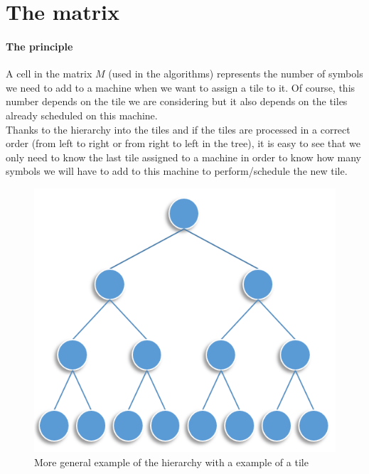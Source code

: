\documentclass[a4paper, 11pt]{report}
\begin{document}
\newpage
\section{The matrix}
\paragraph{The principle} A cell in the matrix $M$ (used in the algorithms) represents the number of symbols we need to add to a machine when we want to assign a tile to it. Of course, this number depends on the tile we are considering but it also depends on the tiles already scheduled on this machine.\\
Thanks to the hierarchy into the tiles and if the tiles are processed in a correct order (from left to right or from right to left in the tree), it is easy to see that we only need to know the last tile assigned to a machine in order to know how many symbols we will have to add to this machine to perform/schedule the new tile.\\

\begin{figure}[h]
		\centering
		\includegraphics*[scale=0.7]{Illustrations/Arbre_bin_H3.png}
		\caption{More general example of the hierarchy with a example of a tile}
		\label{tree_model_with_tile}
\end{figure}
\end{document}
